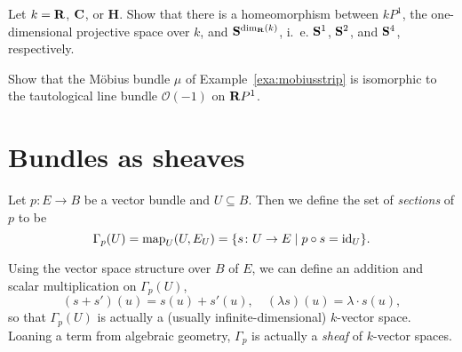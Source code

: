 \documentclass[a4paper,openany]{scrbook}
\begin{document}
\begin{exer} 
Let $k=\R$, $\CC$, or $\mathbf H$. Show that there is a homeomorphism between $kP^1$, the one-dimensional projective space over $k$, and $\S^{\dim_\R(k)}$, i.~e. $\S^1$, $\S^2$, and $\S^4$, respectively.

Show that the Möbius bundle $\mu$ of Example~\ref{exa:mobiusstrip} is isomorphic to the tautological line bundle $\mathcal O(-1)$ on $\R P^1$.
\end{exer}

\section{Bundles as sheaves} \label{sec:bundlesassheaves}

\begin{defn}
Let $p\colon E \to B$ be a vector bundle and $U \subseteq B$. Then we define the set of \emph{sections} of $p$ to be
\[
\Gamma_p(U) = \map_U(U,E_U) = \{s\colon U \to E \mid p \circ s = \id_U\}.
\]
\end{defn}
Using the vector space structure over $B$ of $E$, we can define an addition and scalar multiplication on $\Gamma_p(U)$,
\[
(s+s')(u) = s(u)+s'(u), \quad (\lambda s)(u) = \lambda \cdot s(u),
\]
so that $\Gamma_p(U)$ is actually a (usually infinite-dimensional) $k$-vector space. Loaning a term from algebraic geometry, $\Gamma_p$ is actually a \emph{sheaf} of $k$-vector spaces.
\end{document}
